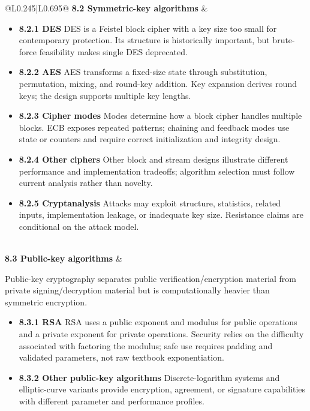 \documentclass[10pt,letterpaper]{article}
\begin{document}
\begin{longtable}{@{}L{0.245\textwidth}|L{0.695\textwidth}@{}}
\textbf{8.2 Symmetric-key algorithms} & \begin{minipage}[t]{\linewidth}\raggedright \begin{itemize}\item \textbf{8.2.1 DES} DES is a Feistel block cipher with a key size too small for contemporary protection. Its structure is historically important, but brute-force feasibility makes single DES deprecated.\item \textbf{8.2.2 AES} AES transforms a fixed-size state through substitution, permutation, mixing, and round-key addition. Key expansion derives round keys; the design supports multiple key lengths.\item \textbf{8.2.3 Cipher modes} Modes determine how a block cipher handles multiple blocks. ECB exposes repeated patterns; chaining and feedback modes use state or counters and require correct initialization and integrity design.\item \textbf{8.2.4 Other ciphers} Other block and stream designs illustrate different performance and implementation tradeoffs; algorithm selection must follow current analysis rather than novelty.\item \textbf{8.2.5 Cryptanalysis} Attacks may exploit structure, statistics, related inputs, implementation leakage, or inadequate key size. Resistance claims are conditional on the attack model.\end{itemize}\end{minipage} \\ \hline
{}\textbf{8.3 Public-key algorithms} & \begin{minipage}[t]{\linewidth}\raggedright Public-key cryptography separates public verification/encryption material from private signing/decryption material but is computationally heavier than symmetric encryption.\par\begin{itemize}\item \textbf{8.3.1 RSA} RSA uses a public exponent and modulus for public operations and a private exponent for private operations. Security relies on the difficulty associated with factoring the modulus; safe use requires padding and validated parameters, not raw textbook exponentiation.\item \textbf{8.3.2 Other public-key algorithms} Discrete-logarithm systems and elliptic-curve variants provide encryption, agreement, or signature capabilities with different parameter and performance profiles.\end{itemize}\end{minipage} \\ \hline

\end{longtable}
\end{document}
